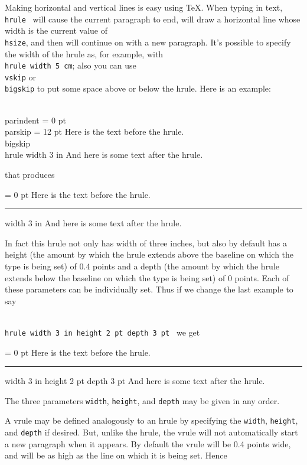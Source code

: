 Making horizontal and vertical lines is easy using \TeX\null. 
When typing in text, {\tt \\hrule } will cause the current 
paragraph to end, will draw a horizontal line whose width is the 
current value of {\tt \\hsize}, and then will continue on with a 
new paragraph.  It's possible to specify the width of the hrule 
as, for example, with {\tt \\hrule width 5 cm}; also you can use 
{\tt \\vskip} or {\tt \\bigskip} to put some space above or below 
the hrule.  Here is an example: 

\beginuser 
\\parindent = 0 pt \\parskip = 12 pt 
Here is the text before the hrule. 
\\bigskip 
\\hrule width 3 in 
And here is some text after the hrule. 
\enduser 

\noindent that produces 
\vfill\eject 

{ 
\parindent = 0 pt 
Here is the text before the hrule. 
\bigskip 
\hrule width 3 in 
And here is some text after the hrule. 
} 

In fact this hrule not only has width of three inches, but also 
by default has a height (the amount by which the hrule extends 
above the baseline on which the type is being set) of 0.4 points 
and a depth (the amount by which the hrule extends below the 
baseline on which the type is being set) of 0 points.  Each of 
these parameters can be individually set.  Thus if we change the 
last example to say 

{\tt \\hrule width 3 in height 2 pt depth 3 pt } we get 

{ 
\parindent = 0 pt 
Here is the text before the hrule. 
\bigskip 
\hrule width 3 in height 2 pt depth 3 pt 
And here is some text after the hrule. 
} 

The three parameters {\tt width}, {\tt height}, and {\tt depth} may 
be given in any order. 

A vrule may be defined analogously to an hrule by specifying the 
{\tt width}, {\tt height}, and {\tt depth} if desired. 
But, unlike the hrule, the vrule will not automatically start a 
new paragraph when it appears.  By default the vrule will be 0.4 
points wide, and will be as high as the line on which it is being 
set. Hence 

